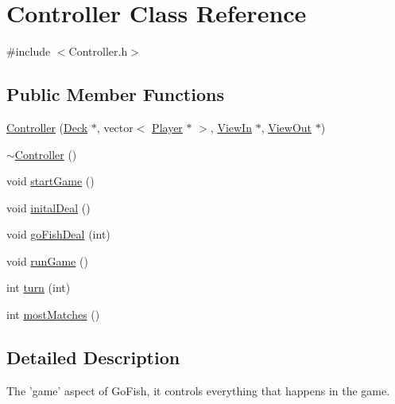 \hypertarget{class_controller}{\section{Controller Class Reference}
\label{class_controller}
}


{\ttfamily \#include $<$Controller.\-h$>$}

\subsection*{Public Member Functions}
\begin{DoxyCompactItemize}
\item 
\hyperlink{class_controller_acc5b83a368d1b5985f34d28e23c0f4c5}{Controller} (\hyperlink{class_deck}{Deck} $\ast$, vector$<$ \hyperlink{class_player}{Player} $\ast$ $>$, \hyperlink{class_view_in}{View\-In} $\ast$, \hyperlink{class_view_out}{View\-Out} $\ast$)
\item 
\hyperlink{class_controller_a0ab87934c4f7a266cfdb86e0f36bc1b5}{$\sim$\-Controller} ()
\item 
void \hyperlink{class_controller_a3a9e81ea10c63eea81c2612ba3beb5c4}{start\-Game} ()
\item 
void \hyperlink{class_controller_aa2a6716682fa463fc3d6bbdb510630e5}{inital\-Deal} ()
\item 
void \hyperlink{class_controller_aa93207ee72313ca40934a10bf36adca9}{go\-Fish\-Deal} (int)
\item 
void \hyperlink{class_controller_ad65603733541eb7698575f02de8f639d}{run\-Game} ()
\item 
int \hyperlink{class_controller_a9f08004e5e9c6462d188be01d07befe8}{turn} (int)
\item 
int \hyperlink{class_controller_acdf15c4fbe4a2782b3c5d9bc21df4886}{most\-Matches} ()
\end{DoxyCompactItemize}


\subsection{Detailed Description}
The 'game' aspect of Go\-Fish, it controls everything that happens in the game. 

